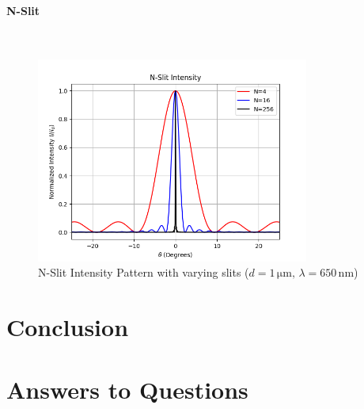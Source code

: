 \documentclass[12pt]{article}
\begin{document}
\paragraph{N-Slit} \mbox{}\\
\begin{figure}[H]
    \centering
    \includegraphics[width=0.8\textwidth]{N-Slit.png}
\caption{N-Slit Intensity Pattern with varying slits ($d=1\,\mathrm{\mu m},\,\lambda=650\,\mathrm{nm}$)}
\end{figure}

\section{Conclusion}
\section{Answers to Questions}
\end{document}

